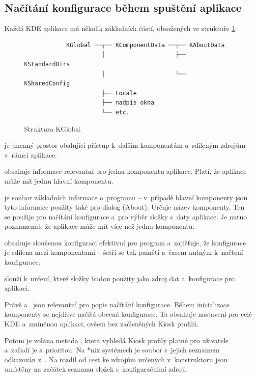 \subsection*{Načítání konfigurace během spuštění aplikace}
Každá KDE aplikace má několik základních částí, obsažených ve struktuře  \ref{fig:kglobal}.

\begin{figure}[h]
    \centering
    \begin{verbatim}
            KGlobal ──┬── KComponentData ──┬── KAboutData
                      │                    ├── KStandardDirs
                      │                    └── KSharedConfig
                      ├── Locale
                      ├── nadpis okna
                      └── etc.\end{verbatim}
    \caption{Struktura KGlobal}
    \label{fig:kglobal}
\end{figure}

 je jmenný prostor obalující přístup k~dalším komponentám a~sdíleným zdrojům v~rámci aplikace.

 obsahuje informace relevantní pro jednu komponentu aplikace. Platí, že aplikace může mít jednu hlavní komponentu.

 je soubor základních informace o~programu -- v~případě hlavní komponenty jsou tyto informace použity také pro dialog  (About). Určuje název komponenty. Ten se použije pro načítání konfigurace a~pro výběr složky s~daty aplikace. Je nutno poznamenat, že aplikace může mít více než jednu komponentu.

 obsahuje sloučenou konfiguraci efektivní pro program a~zajišťuje, že konfigurace je sdílena mezi komponentami -- šetří se tak pamětí a~časem nutným k~načtení konfigurace.

 slouží k~určení, které složky budou použity jako zdroj dat a~konfigurace pro aplikaci.

Právě  a~ jsou relevantní pro popis načítání konfigurace. Během inicializace komponenty se nejdříve načítá obecná konfigurace. Ta obsahuje nastavení pro celé KDE a~zmíněnou aplikaci, ovšem bez začleněných Kiosk profilů.

Potom je volána metoda , která vyhledá Kiosk profily platné pro uživatele a~zařadí je s~prioritou. Na *nix systémech je soubor s~jejich seznamem odkazován z~. Na rozdíl od cest ke zdrojům určených v~konstruktoru  jsou umístěny na začátek seznamu složek s~konfiguračními zdroji.

